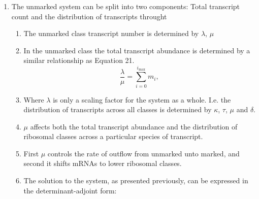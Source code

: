 \documentclass[review]{elsarticle}
\newcommand{\imax}{\ensuremath{i_{\max}}\xspace}
\begin{document}
\begin{enumerate}%
	\item The unmarked system can be split into two components: Total transcript count and the distribution of transcripts throught 
	\begin{enumerate}	
		\item The unmarked class transcript number is determined by $\lambda$, $\mu$
		\item In the unmarked class the total transcript abundance is determined by a similar relationship as Equation 21. %
		\begin{equation}\label{eq:eq_unmarked_sum}
			\frac{\lambda}{\mu}=\sum_{i=0}^{\imax}m_{i},
		\end{equation}
		\item Where $\lambda$ is only a scaling factor for the system as a whole. I.e. the distribution of transcripts across all classes is determined by $\kappa$, $\tau$, $\mu$ and $\delta$. %
		\item $\mu$ affects both the total transcript abundance and the distribution of ribosomal classes across a particular species of transcript.
		\item First $\mu$ controls the rate of outflow from unmarked unto marked, and second it shifts mRNAs to lower ribosomal classes.
		\item The solution to the system, as presented previously, can be expressed in the determinant-adjoint form:

\end{enumerate}
\end{enumerate}
\end{document}

